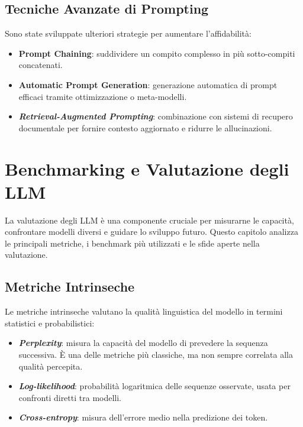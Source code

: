 \subsection{Tecniche Avanzate di Prompting}
Sono state sviluppate ulteriori strategie per aumentare l'affidabilità:
\begin{itemize}
    \item \textbf{Prompt Chaining}: suddividere un compito complesso in più sotto-compiti concatenati.
    \item \textbf{Automatic Prompt Generation}: generazione automatica di prompt efficaci 
    tramite ottimizzazione o meta-modelli.
    \item \textbf{\textit{Retrieval-Augmented Prompting}}: combinazione con sistemi di recupero documentale 
    per fornire contesto aggiornato e ridurre le allucinazioni.
\end{itemize}

\newpage
\section{Benchmarking e Valutazione degli LLM}

La valutazione degli LLM è una componente cruciale per misurarne le capacità, 
confrontare modelli diversi e guidare lo sviluppo futuro. 
Questo capitolo analizza le principali metriche, i benchmark più utilizzati 
e le sfide aperte nella valutazione.

\subsection{Metriche Intrinseche}
Le metriche intrinseche valutano la qualità linguistica del modello 
in termini statistici e probabilistici:
\begin{itemize}
    \item \textbf{\textit{Perplexity}}: misura la capacità del modello di prevedere la sequenza successiva. 
    È una delle metriche più classiche, ma non sempre correlata alla qualità percepita.
    \item \textbf{\textit{Log-likelihood}}: probabilità logaritmica delle sequenze osservate, 
    usata per confronti diretti tra modelli.
    \item \textbf{\textit{Cross-entropy}}: misura dell'errore medio nella predizione dei token.
\end{itemize}

